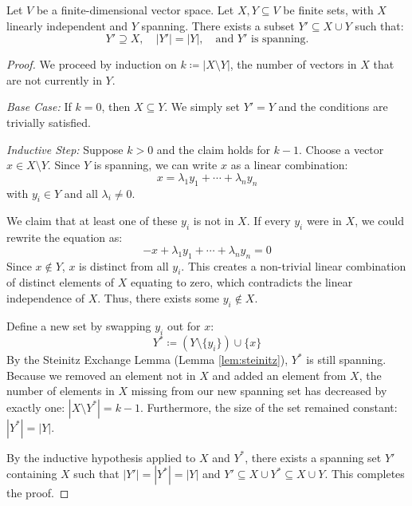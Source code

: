 \documentclass[../linear_algebra_and_groups.tex]{subfiles}
\begin{document}
\begin{lemma}
    \label{lem:cardinalityinduction}
        \begin{shaded*}
            Let $V$ be a finite-dimensional vector space. Let $X, Y \subseteq V$ be finite sets, with $X$ linearly independent and $Y$ spanning. There exists a subset $Y' \subseteq X \cup Y$ such that:
            \[ Y' \supseteq X, \quad |Y'| = |Y|, \quad \text{and } Y' \text{ is spanning.} \]
        \end{shaded*}
    \end{lemma}
    \begin{proof}
        We proceed by induction on $k \coloneqq |X \setminus Y|$, the number of vectors in $X$ that are not currently in $Y$.
        
        \textit{Base Case:} If $k = 0$, then $X \subseteq Y$. We simply set $Y' = Y$ and the conditions are trivially satisfied.
        
        \textit{Inductive Step:} Suppose $k > 0$ and the claim holds for $k - 1$. Choose a vector $x \in X \setminus Y$. Since $Y$ is spanning, we can write $x$ as a linear combination:
        \[ x = \lambda_1 y_1 + \cdots + \lambda_n y_n \]
        with $y_i \in Y$ and all $\lambda_i \ne 0$. 
        
        We claim that at least one of these $y_i$ is not in $X$. If every $y_i$ were in $X$, we could rewrite the equation as:
        \[ -x + \lambda_1 y_1 + \cdots + \lambda_n y_n = 0 \]
        Since $x \notin Y$, $x$ is distinct from all $y_i$. This creates a non-trivial linear combination of distinct elements of $X$ equating to zero, which contradicts the linear independence of $X$. Thus, there exists some $y_i \notin X$.
        
        Define a new set by swapping $y_i$ out for $x$:
        \[ Y^* \coloneqq (Y \setminus \{y_i\}) \cup \{x\} \]
        By the Steinitz Exchange Lemma (Lemma \ref{lem:steinitz}), $Y^*$ is still spanning. Because we removed an element not in $X$ and added an element from $X$, the number of elements in $X$ missing from our new spanning set has decreased by exactly one: $|X \setminus Y^*| = k - 1$. Furthermore, the size of the set remained constant: $|Y^*| = |Y|$.
        
        By the inductive hypothesis applied to $X$ and $Y^*$, there exists a spanning set $Y'$ containing $X$ such that $|Y'| = |Y^*| = |Y|$ and $Y' \subseteq X \cup Y^* \subseteq X \cup Y$. This completes the proof.
        \qedhere
    \end{proof}
\end{document}
